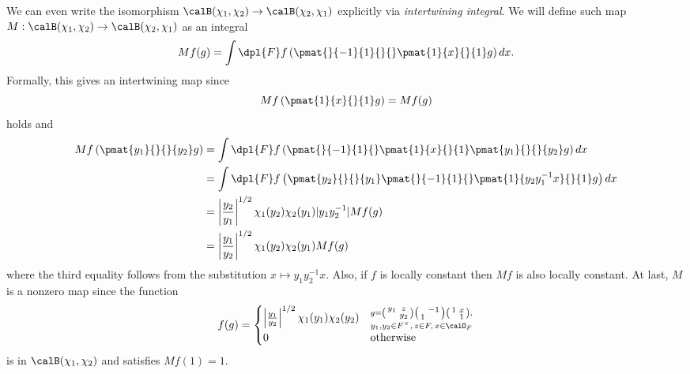 We can even write the isomorphism $\calB(\chi_1, \chi_2) \to \calB(\chi_2, \chi_1)$ explicitly via \emph{intertwining integral}. 
We will define such map $M:\calB(\chi_1, \chi_2) \to \calB(\chi_2, \chi_1)$ as an integral
$$
Mf(g) = \int\dpl{F} f\left( \pmat{}{-1}{1}{}{}\pmat{1}{x}{}{1} g\right) dx.
$$
Formally, this gives an intertwining map since
$$
Mf\left(\pmat{1}{x}{}{1}g\right) = Mf(g)
$$
holds and 
\begin{align*}
Mf\left( \pmat{y_{1}}{}{}{y_{2}}g \right) &= \int\dpl{F} f\left( \pmat{}{-1}{1}{} \pmat{1}{x}{}{1}\pmat{y_{1}}{}{}{y_{2}}g\right) dx \\
&= \int\dpl{F} f\left( \pmat{y_{2}}{}{}{y_{1}} \pmat{}{-1}{1}{} \pmat{1}{y_{2}y_{1}^{-1}x}{}{1}g\right)dx \\
&=\left| \frac{y_{2}}{y_{1}}\right|^{1/2} \chi_{1}(y_{2})\chi_{2}(y_{1}) |y_{1}y_{2}^{-1}| Mf(g) \\
&=\left|\frac{y_{1}}{y_{2}}\right|^{1/2} \chi_{1}(y_{2})\chi_{2}(y_{1}) Mf(g)
\end{align*}
where the third equality follows from the substitution $x\mapsto y_{1}y_{2}^{-1}x$. Also, if $f$ is locally constant then $Mf$ is also locally constant. At last, $M$ is a nonzero map since the function
$$
f(g) = \begin{cases} \left|\frac{y_{1}}{y_{2}}\right|^{1/2} \chi_{1}(y_{1})\chi_{2}(y_{2}) & \substack{g = \smat{y_{1}}{z}{}{y_{2}} \smat{}{-1}{1}{} \smat{1}{x}{}{1}, \\ y_{1}, y_{2}\in F^{\times},\, z\in F,\, x\in \calO_F }\\
0 & \text{otherwise} \end{cases}
$$
is in $\calB(\chi_1, \chi_2)$ and satisfies $Mf(1) = 1$. 

